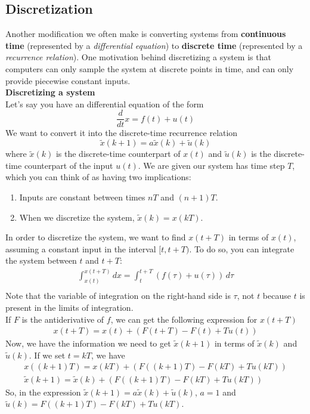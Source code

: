 \subsection*{Discretization}
Another modification we often make is converting systems from \textbf{continuous time} (represented by a \textit{differential equation}) to \textbf{discrete time} (represented by a \textit{recurrence relation}).
One motivation behind discretizing a system is that computers can only sample the system at discrete points in time, and can only provide piecewise constant inputs. \\
\newline
\textbf{Discretizing a system} \\
Let's say you have an differential equation of the form
$$\frac{d}{dt} x = f(t) + u(t)$$
We want to convert it into the discrete-time recurrence relation
$$\tilde{x}(k + 1) = a\tilde{x}(k) + \tilde{u}(k)$$
where $\tilde{x}(k)$ is the discrete-time counterpart of $x(t)$ and $\tilde{u}(k)$ is the discrete-time counterpart of the input $u(t)$.
\newline
We are given our system has time step $T$, which you can think of as having two implications:
\begin{enumerate}
    \item Inputs are constant between times $nT$ and $(n + 1)T$.
    \item When we discretize the system, $\tilde{x}(k) = x(kT)$.
\end{enumerate}
In order to discretize the system, we want to find $x(t + T)$ in terms of $x(t)$, assuming a constant input in the interval $[t, t + T)$.
To do so, you can integrate the system between $t$ and $t + T$:
\begin{align*}
    \int_{x(t)}^{x(t + T)} dx = \int_t^{t + T} (f(\tau) + u(\tau)) \, d\tau \\
\end{align*}
Note that the variable of integration on the right-hand side is $\tau$, not $t$ because $t$ is present in the limits of integration. \\
If $F$ is the antiderivative of $f$, we can get the following expression for $x(t + T)$
\begin{align*}
    x(t + T) = x(t) + (F(t + T) - F(t) + Tu(t))
\end{align*}
Now, we have the information we need to get $\tilde{x}(k + 1)$ in terms of $\tilde{x}(k)$ and $\tilde{u}(k)$. 
If we set $t = kT$, we have
\begin{align*}
    x((k + 1)T) = x(kT) + (F((k + 1)T) - F(kT) + Tu(kT)) \\
    \tilde{x}(k + 1) = \tilde{x}(k) + (F((k + 1)T) - F(kT) + Tu(kT))
\end{align*}
So, in the expression $\tilde{x}(k + 1) = a\tilde{x}(k) + \tilde{u}(k)$, $a = 1$ and $\tilde{u}(k) = F((k + 1)T) - F(kT) + Tu(kT)$.

